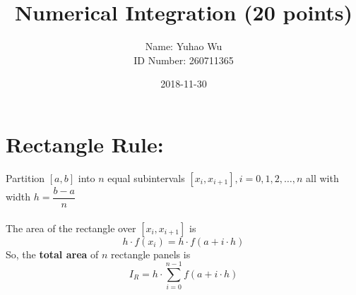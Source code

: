 \documentclass [9 pt]{article}
\theoremstyle{definition}
\begin{document}
\title{Numerical Integration (20 points)}
\date{2018-11-30}
\author{Name: Yuhao Wu\\
ID Number: 260711365
}
\maketitle

\section*{Rectangle Rule:}
Partition $[a, b]$ into $n$ equal subintervals $[x_i, x_{i+1}], i = 0, 1, 2, \ldots , n$ all with width $h = \dfrac{b - a}{n}$\\
\\
The area of the rectangle over $[x_i, x_{i+1}]$ is 
$$ h \cdot f(x_i) = h \cdot f(a + i \cdot h) $$
So, the \textbf{ total area } of $n$ rectangle panels is 
$$I_R = h \cdot \sum_{i = 0}^{n - 1} f(a + i \cdot h)$$
\end{document}
